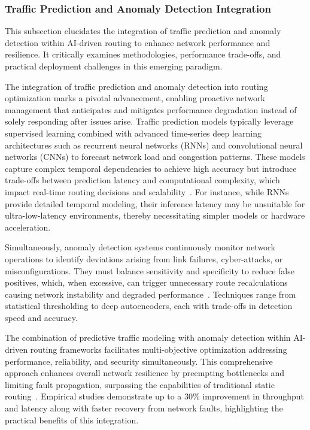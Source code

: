 \documentclass[sigconf]{acmart}
\begin{document}
\subsubsection{Traffic Prediction and Anomaly Detection Integration}

This subsection elucidates the integration of traffic prediction and anomaly detection within AI-driven routing to enhance network performance and resilience. It critically examines methodologies, performance trade-offs, and practical deployment challenges in this emerging paradigm.

The integration of traffic prediction and anomaly detection into routing optimization marks a pivotal advancement, enabling proactive network management that anticipates and mitigates performance degradation instead of solely responding after issues arise. Traffic prediction models typically leverage supervised learning combined with advanced time-series deep learning architectures such as recurrent neural networks (RNNs) and convolutional neural networks (CNNs) to forecast network load and congestion patterns. These models capture complex temporal dependencies to achieve high accuracy but introduce trade-offs between prediction latency and computational complexity, which impact real-time routing decisions and scalability~\cite{ref50}. For instance, while RNNs provide detailed temporal modeling, their inference latency may be unsuitable for ultra-low-latency environments, thereby necessitating simpler models or hardware acceleration.

Simultaneously, anomaly detection systems continuously monitor network operations to identify deviations arising from link failures, cyber-attacks, or misconfigurations. They must balance sensitivity and specificity to reduce false positives, which, when excessive, can trigger unnecessary route recalculations causing network instability and degraded performance~\cite{ref53}. Techniques range from statistical thresholding to deep autoencoders, each with trade-offs in detection speed and accuracy.

The combination of predictive traffic modeling with anomaly detection within AI-driven routing frameworks facilitates multi-objective optimization addressing performance, reliability, and security simultaneously. This comprehensive approach enhances overall network resilience by preempting bottlenecks and limiting fault propagation, surpassing the capabilities of traditional static routing~\cite{ref53}. Empirical studies demonstrate up to a 30\% improvement in throughput and latency along with faster recovery from network faults, highlighting the practical benefits of this integration.
\end{document}

